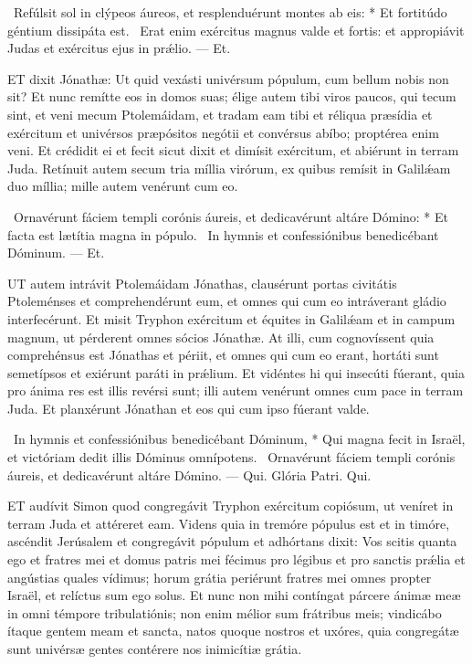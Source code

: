 \R\ Refúlsit sol in clýpeos áureos, et resplenduérunt montes ab eis: * Et fortitúdo géntium dissipáta est. \V\ Erat enim exércitus magnus valde et fortis: et appropiávit Judas et exércitus ejus in prǽlio. — Et.


\lettrine[lines=2]{E}{T} dixit Jónathæ: Ut quid vexásti univérsum pópulum, cum bellum nobis non sit? Et nunc remítte eos in domos suas; élige autem tibi viros paucos, qui tecum sint, et veni mecum Ptolemáidam, et tradam eam tibi et réliqua præsídia et exércitum et univérsos præpósitos negótii et convérsus abíbo; proptérea enim veni. Et crédidit ei et fecit sicut dixit et dimísit exércitum, et abiérunt in terram Juda. Retínuit autem secum tria míllia virórum, ex quibus remísit in Galilǽam duo míllia; mille autem venérunt cum eo.

\R\ Ornavérunt fáciem templi corónis áureis, et dedicavérunt altáre Dómino: * Et facta est lætítia magna in pópulo. \V\ In hymnis et confessiónibus benedicébant Dóminum. — Et.



\lettrine[lines=2]{U}{T} autem intrávit Ptolemáidam Jónathas, clausérunt portas civitátis Ptoleménses et comprehendérunt eum, et omnes qui cum eo intráverant gládio interfecérunt. Et misit Tryphon exércitum et équites in Galilǽam et in campum magnum, ut pérderent omnes sócios Jónathæ. At illi, cum cognovíssent quia comprehénsus est Jónathas et périit, et omnes qui cum eo erant, hortáti sunt semetípsos et exiérunt paráti in prǽlium. Et vidéntes hi qui insecúti fúerant, quia pro ánima res est illis revérsi sunt; illi autem venérunt omnes cum pace in terram Juda. Et planxérunt Jónathan et eos qui cum ipso fúerant valde.

\R\ In hymnis et confessiónibus benedicébant Dóminum, * Qui magna fecit in Israël, et victóriam dedit illis Dóminus omnípotens. \V\ Ornavérunt fáciem templi corónis áureis, et dedicavérunt altáre Dómino. — Qui. Glória Patri. Qui.




\lettrine[lines=2]{E}{T} audívit Simon quod congregávit Tryphon exércitum copiósum, ut veníret in terram Juda et attéreret eam. Videns quia in tremóre pópulus est et in timóre, ascéndit Jerúsalem et congregávit pópulum et adhórtans dixit: Vos scitis quanta ego et fratres mei et domus patris mei fécimus pro légibus et pro sanctis prǽlia et angústias quales vídimus; horum grátia periérunt fratres mei omnes propter Israël, et relíctus sum ego solus. Et nunc non mihi contíngat párcere ánimæ meæ in omni témpore tribulatiónis; non enim mélior sum frátribus meis; vindicábo ítaque gentem meam et sancta, natos quoque nostros et uxóres, quia congregátæ sunt univérsæ gentes contérere nos inimicítiæ grátia.

